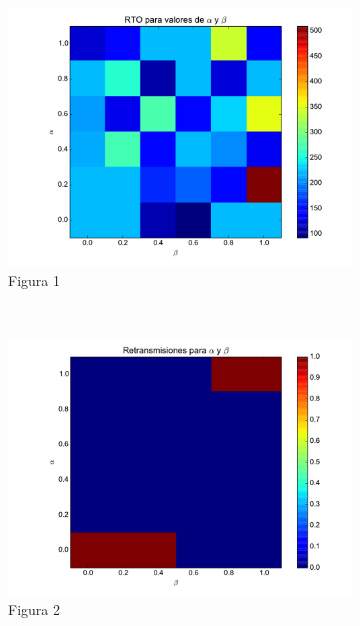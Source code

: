     \begin{figure}[H]
	    \center
	    \begin{subfigure}{0.32\textwidth}
		    \includegraphics[width=1.0\textwidth]{imagenes/guille/rto_vs_alphaBeta.pdf}
		    \caption{Figura 1}
	    \end{subfigure}
	    ~
	    \begin{subfigure}{0.32\textwidth}
		    \includegraphics[width=1.0\textwidth]{imagenes/guille/retransmisiones_150.pdf}
		    \caption{Figura 2}
	    \end{subfigure}
	    ~
	    \begin{subfigure}{0.32\textwidth}

\end{subfigure}
\end{figure}
